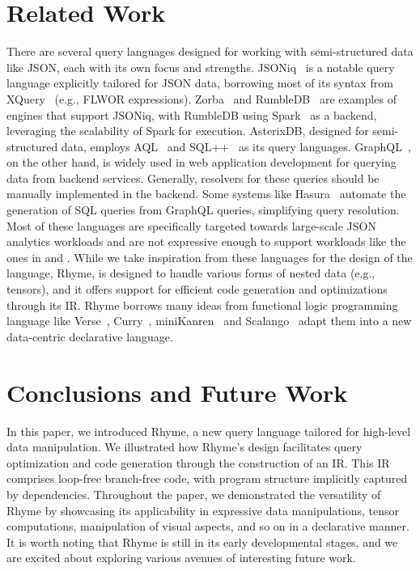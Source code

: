 \documentclass[runningheads]{llncs}
\newcommand{\lang}{Rhyme}
\begin{document}
\section{Related Work}\label{sec:related_work}
There are several query languages designed for working with semi-structured data like
JSON, each with its own focus and strengths.
JSONiq~\cite{jsoniq,jsoniq_paper} is a notable query language explicitly tailored for
JSON data, borrowing most of its syntax from XQuery~\cite{xquery} (e.g., FLWOR expressions).
Zorba~\cite{zobra} and RumbleDB~\cite{rumble_vldb} are examples of engines that support
JSONiq, with RumbleDB using Spark~\cite{spark} as a backend, leveraging the scalability
of Spark for execution.
AsterixDB, designed for semi-structured data, employs AQL~\cite{aql} and SQL++~\cite{sqlpp}
as its query languages.
GraphQL~\cite{graphql}, on the other hand, is widely used in web application development
for querying data from backend services.
Generally, resolvers for these queries should be manually implemented in the backend.
Some systems like Hasura~\cite{hasura} automate the generation of SQL queries from
GraphQL queries, simplifying query resolution.
Most of these languages are specifically targeted towards large-scale JSON analytics workloads
and are not expressive enough to support workloads like the ones
in  and .
While we take inspiration from these languages for the design of the language,
\lang{}, is designed to handle various forms of nested data (e.g., tensors),
and it offers support for efficient code generation and optimizations
through its IR.
\lang{} borrows many ideas from functional logic programming language like
Verse~\cite{verse}, Curry~\cite{curry}, miniKanren~\cite{miniKanren_thesis} and 
Scalango~\cite{scalango} adapt them into a new data-centric declarative language.





\section{Conclusions and Future Work}\label{sec:conclusions}

In this paper, we introduced \lang{}, a new query language tailored for high-level
data manipulation.
We illustrated how \lang{}'s design facilitates query optimization and code generation
through the construction of an IR.
This IR comprises loop-free branch-free code, with program structure implicitly captured
by dependencies.
Throughout the paper, we demonstrated the versatility of \lang{} by showcasing its
applicability in expressive data manipulations,
tensor computations, manipulation of visual aspects, and so on in a declarative manner.
It is worth noting that \lang{} is still in its early developmental stages,
and we are excited about exploring various avenues of interesting future work.
\end{document}
